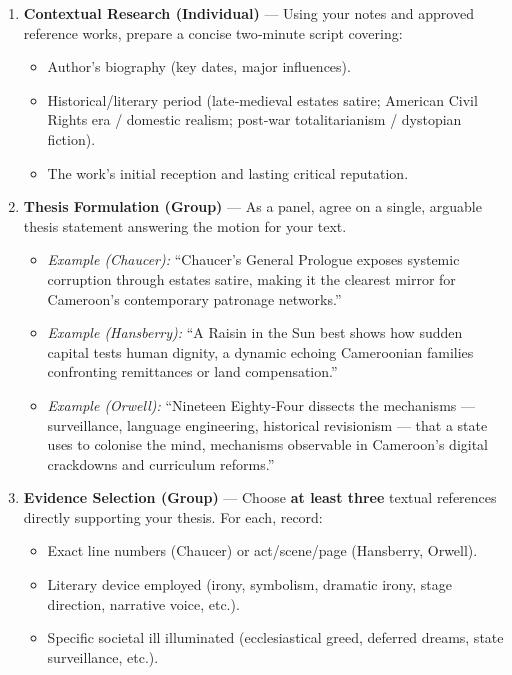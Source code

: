 \documentclass[11pt]{article}
\newcounter{popsec}
\newcounter{popsub}
\newcommand{\courssub}[1]{%
  \stepcounter{popsub}%
  \par\vspace{9pt}\noindent{\popxbold\fontsize{11.5}{13}\selectfont\color{popink}{\color{poporange}\thepopsec.\thepopsub}\hspace{6pt}#1}\par\nopagebreak\vspace{4pt}
}
\begin{document}
\courssub{Tasks}

\begin{methode}
\begin{enumerate}
\item \textbf{Contextual Research (Individual)} — Using your notes and approved reference works, prepare a concise two‑minute script covering:
      \begin{itemize}
          \item Author’s biography (key dates, major influences).
          \item Historical/literary period (late‑medieval estates satire; American Civil Rights era / domestic realism; post‑war totalitarianism / dystopian fiction).
          \item The work’s initial reception and lasting critical reputation.
      \end{itemize}
\item \textbf{Thesis Formulation (Group)} — As a panel, agree on a single, arguable thesis statement answering the motion for your text. 
      \begin{itemize}
          \item \emph{Example (Chaucer):} “Chaucer’s General Prologue exposes systemic corruption through estates satire, making it the clearest mirror for Cameroon’s contemporary patronage networks.”
          \item \emph{Example (Hansberry):} “A Raisin in the Sun best shows how sudden capital tests human dignity, a dynamic echoing Cameroonian families confronting remittances or land compensation.”
          \item \emph{Example (Orwell):} “Nineteen Eighty‑Four dissects the mechanisms — surveillance, language engineering, historical revisionism — that a state uses to colonise the mind, mechanisms observable in Cameroon’s digital crackdowns and curriculum reforms.”
      \end{itemize}
\item \textbf{Evidence Selection (Group)} — Choose \textbf{at least three} textual references directly supporting your thesis. For each, record:
      \begin{itemize}
          \item Exact line numbers (Chaucer) or act/scene/page (Hansberry, Orwell).
          \item Literary device employed (irony, symbolism, dramatic irony, stage direction, narrative voice, etc.).
          \item Specific societal ill illuminated (ecclesiastical greed, deferred dreams, state surveillance, etc.).

\end{itemize}
\end{enumerate}
\end{methode}
\end{document}
